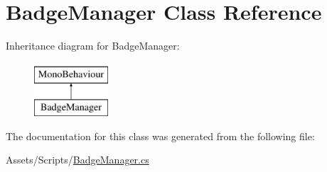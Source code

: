 \hypertarget{classBadgeManager}{}\section{Badge\+Manager Class Reference}
\label{classBadgeManager}
Inheritance diagram for Badge\+Manager\+:\begin{figure}[H]
\begin{center}
\leavevmode
\includegraphics[height=2.000000cm]{classBadgeManager}
\end{center}
\end{figure}


The documentation for this class was generated from the following file\+:\begin{DoxyCompactItemize}
\item 
Assets/\+Scripts/\hyperlink{BadgeManager_8cs}{Badge\+Manager.\+cs}\end{DoxyCompactItemize}
